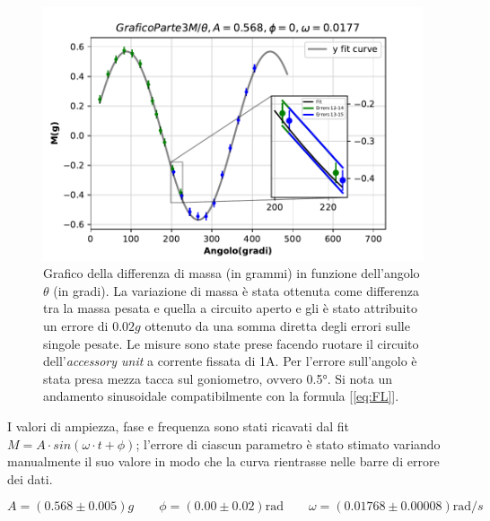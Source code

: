 {\fontsize{12}{14}\selectfont 

\begin{figure}[H]
  \centering
  \includegraphics[width=15cm]{Figures/GraficoMthetaParte3.pdf}
  \caption{Grafico della differenza di massa (in grammi) in funzione dell'angolo $\theta$ (in gradi). La variazione di massa è stata ottenuta come differenza tra la massa pesata e quella a circuito aperto e gli è stato attribuito un errore di $0.02g$ ottenuto da una somma diretta degli errori sulle singole pesate. Le misure sono state prese facendo ruotare il circuito dell'\emph{accessory unit} a corrente fissata di 1A. Per l'errore sull'angolo è stata presa mezza tacca sul goniometro, ovvero 0.5°.
  Si nota un andamento sinusoidale compatibilmente con la formula [\ref{eq:FL}].}   
  \label{fig:GraficoParteIII}
\end{figure}
I valori di ampiezza, fase e frequenza sono stati ricavati dal fit $M = A \cdot sin(\omega \cdot t + \phi)$; l'errore di ciascun parametro è stato stimato variando manualmente il suo valore in modo che la curva rientrasse nelle barre di errore dei dati.

\begin{equation*}
    A = (0.568 \pm 0.005) g \qquad \phi = (0.00 \pm 0.02) \text{rad} \qquad \omega = (0.01768 \pm 0.00008)\text{rad}/s %
\end{equation*}

\par}